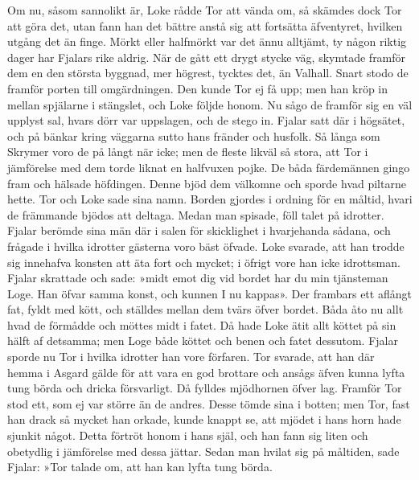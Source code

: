 Om nu, såsom sannolikt är, Loke rådde Tor att vända om, så skämdes dock
Tor att göra det, utan fann han det bättre anstå sig att fortsätta
äfventyret, hvilken utgång det än finge. Mörkt eller halfmörkt var det
ännu alltjämt, ty någon riktig dager har Fjalars rike aldrig. När de
gått ett drygt stycke väg, skymtade framför dem en den största byggnad,
mer högrest, tycktes det, än Valhall. Snart stodo de framför porten till
omgärdningen. Den kunde Tor ej få upp; men han kröp in mellan spjälarne
i stängslet, och Loke följde honom. Nu sågo de framför sig en väl
upplyst sal, hvars dörr var uppslagen, och de stego in. Fjalar satt där
i högsätet, och på bänkar kring väggarna sutto hans fränder och husfolk.
Så långa som Skrymer voro de på långt när icke; men de fleste likväl så
stora, att Tor i jämförelse med dem torde liknat en halfvuxen pojke. De
båda färdemännen gingo fram och hälsade höfdingen. Denne bjöd dem
välkomne och sporde hvad piltarne hette. Tor och Loke sade sina namn.
Borden gjordes i ordning för en måltid, hvari de främmande bjödos att
deltaga. Medan man spisade,
\protect\hypertarget{lb1625905.xhtmlux5cux23start43}{}{}\protect\hypertarget{lb1625905.xhtmlux5cux23start43-a}{}{}\protect\hypertarget{lb1625905.xhtmlux5cux23start43-b}{}{}\protect\hypertarget{lb1625905.xhtmlux5cux23start43-c}{}{}\protect\hypertarget{lb1625905.xhtmlux5cux23start43-d}{}{}
föll talet på idrotter. Fjalar berömde sina män där i salen för
skicklighet i hvarjehanda sådana, och frågade i hvilka idrotter gästerna
voro bäst öfvade. Loke svarade, att han trodde sig innehafva konsten att
äta fort och mycket; i öfrigt vore han icke idrottsman. Fjalar skrattade
och sade: »midt emot dig vid bordet har du min tjänsteman Loge. Han
öfvar samma konst, och kunnen I nu kappas». Der frambars ett aflångt
fat, fyldt med kött, och ställdes mellan dem tvärs öfver bordet. Båda
åto nu allt hvad de förmådde och möttes midt i fatet. Då hade Loke ätit
allt köttet på sin hälft af detsamma; men Loge både köttet och benen och
fatet dessutom. Fjalar sporde nu Tor i hvilka idrotter han vore
förfaren. Tor svarade, att han där hemma i Asgard gälde för att vara en
god brottare och ansågs äfven kunna lyfta tung börda och dricka
försvarligt. Då fylldes mjödhornen öfver lag. Framför Tor stod ett, som
ej var större än de andres. Desse tömde sina i botten; men Tor, fast han
drack så mycket han orkade, kunde knappt se, att mjödet i hans horn hade
sjunkit något. Detta förtröt honom i hans själ, och han fann sig liten
och obetydlig i jämförelse med dessa jättar. Sedan man hvilat sig på
måltiden, sade Fjalar: »Tor talade om, att han kan lyfta tung börda.
